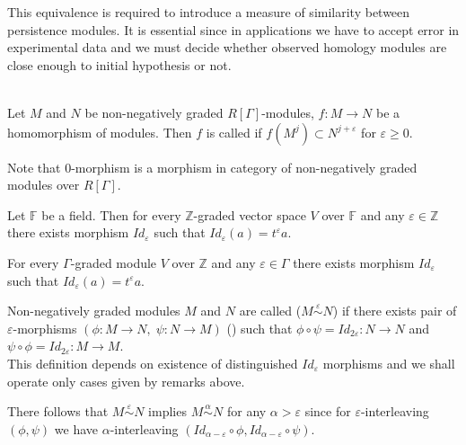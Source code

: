 This equivalence is required to introduce a measure of similarity between persistence modules. It is essential since in applications we have to accept error in experimental data and we must decide whether observed homology modules are close enough to initial hypothesis or not.

\begin{definition} {\cite[Definition 2.7]{GS16}}\\
  Let $M$ and $N$ be non-negatively graded $R[\Gamma]$-modules, $f : M \to N$ be a homomorphism of modules. Then $f$ is called  if $f(M^j) \subset N^{j+\varepsilon}$ for $\varepsilon \geq 0$.
\end{definition}

\begin{remark}
  Note that $0$-morphism is a morphism in category of non-negatively graded modules over $R[\Gamma]$.
\end{remark}

\begin{remark}
  Let $\mathbb{F}$ be a field. Then for every $\mathbb{Z}$-graded vector space $V$ over $\mathbb{F}$ and any $\varepsilon \in \mathbb{Z}$ there exists morphism $Id_{\varepsilon}$ such that $Id_{\varepsilon}(a) = t^{\varepsilon}a$.
\end{remark}

\begin{remark}
  For every $\Gamma$-graded module $V$ over $\mathbb{Z}$ and any $\varepsilon \in \Gamma$ there exists morphism $Id_{\varepsilon}$ such that $Id_{\varepsilon}(a) = t^{\varepsilon}a$.
\end{remark}

\begin{definition}
  Non-negatively graded modules $M$ and $N$ are called  ($M \stackrel{\varepsilon}{\sim} N$) if there exists pair of $\varepsilon$-morphisms $(\phi : M \to N,\;\psi : N \to M)$ () such that $\phi \circ \psi = Id_{2\varepsilon} : N \to N$ and $\psi \circ \phi = Id_{2\varepsilon} : M \to M$.\\

  This definition depends on existence of distinguished $Id_{\varepsilon}$ morphisms and we shall operate only cases given by remarks above.
\end{definition}

\begin{remark}
There follows that $M \stackrel{\varepsilon}{\sim} N$ implies $M \stackrel{\alpha}{\sim} N$ for any $\alpha > \varepsilon$ since for $\varepsilon$-interleaving $(\phi, \psi)$ we have $\alpha$-interleaving $(Id_{\alpha - \varepsilon} \circ \phi, Id_{\alpha - \varepsilon} \circ \psi)$.
\end{remark}

